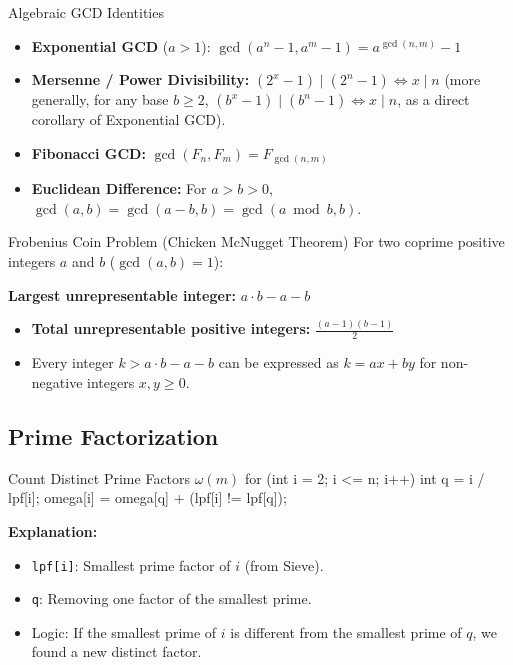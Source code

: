 \documentclass[10pt]{article}
\newcommand{\complexity}[1]{%
  \tcbox[on line,
    colback=tagbg,
    colframe=tagbg,
    boxrule=0pt,
    arc=2pt,
    boxsep=0pt,
    left=3.5pt, right=3.5pt, top=1.5pt, bottom=1.5pt
  ]{\color{tagtext}\scriptsize\bfseries\ensuremath{#1}}%
}
\begin{document}
\begin{conceptbox}{Algebraic GCD Identities}
    \begin{itemize}
        \item \textbf{Exponential GCD} ($a > 1$): $\gcd(a^n - 1, a^m - 1) = a^{\gcd(n, m)} - 1$
        \item \textbf{Mersenne / Power Divisibility:} $(2^x - 1) \mid (2^n - 1) \iff x \mid n$ (more generally, for any base $b \ge 2$, $(b^x - 1) \mid (b^n - 1) \iff x \mid n$, as a direct corollary of Exponential GCD).
        \item \textbf{Fibonacci GCD:} $\gcd(F_n, F_m) = F_{\gcd(n, m)}$
        \item \textbf{Euclidean Difference:} For $a > b > 0$, $\gcd(a, b) = \gcd(a - b, b) = \gcd(a \bmod b, b)$.
    \end{itemize}
\end{conceptbox}

\begin{conceptbox}{Frobenius Coin Problem (Chicken McNugget Theorem)}
    For two coprime positive integers $a$ and $b$ ($\gcd(a, b) = 1$):
    \begin{resultbox}
        \textbf{Largest unrepresentable integer:} $a \cdot b - a - b$
    \end{resultbox}
    \begin{itemize}
        \item \textbf{Total unrepresentable positive integers:} $\frac{(a - 1)(b - 1)}{2}$
        \item Every integer $k > a \cdot b - a - b$ can be expressed as $k = a x + b y$ for non-negative integers $x, y \ge 0$.
    \end{itemize}
\end{conceptbox}

\subsection{Prime Factorization}

\begin{vscode}{Count Distinct Prime Factors $\omega(m)$ \complexity{O(N)}}
for (int i = 2; i <= n; i++)
{
    int q = i / lpf[i];
    omega[i] = omega[q] + (lpf[i] != lpf[q]);
}
\end{vscode}
\begin{derivation}
    \textbf{Explanation:}
    \begin{itemize}
        \item \texttt{lpf[i]}: Smallest prime factor of $i$ (from Sieve).
        \item \texttt{q}: Removing one factor of the smallest prime.
        \item Logic: If the smallest prime of $i$ is different from the smallest prime of $q$, we found a new distinct factor.
    \end{itemize}
\end{derivation}
\end{document}
